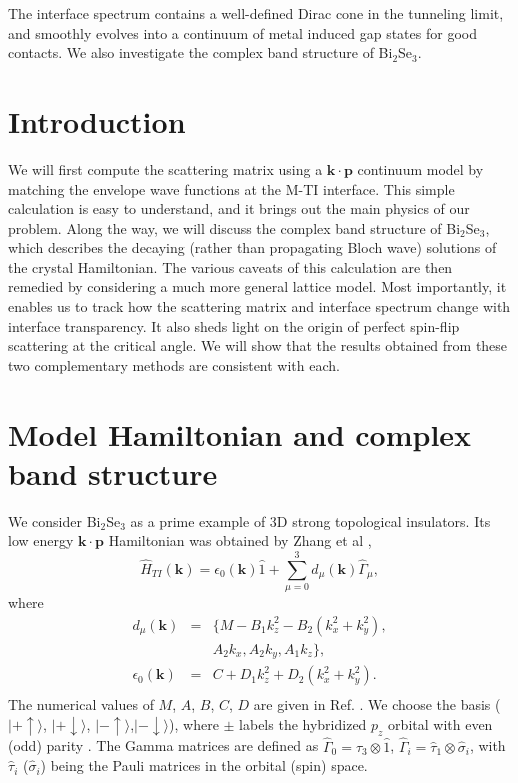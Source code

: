 \documentclass[12pt,twocolumn]{article}
\def\v#1{\mathbf{#1}}
\def\ket#1{\vert #1 \rangle}
\begin{document}
The interface spectrum contains a well-defined Dirac cone in the tunneling limit, and smoothly evolves into a continuum of metal induced gap states for good contacts. We also investigate the complex band structure of Bi$_2$Se$_3$.

\section{Introduction}


We will first compute the scattering matrix using a $\mathbf{k\cdot p}$ continuum model 
by matching the envelope wave functions at the M-TI interface. This simple calculation is easy to understand, 
and it brings out
the main physics of our problem. Along the way, we will discuss the complex band structure of Bi$_2$Se$_3$,
 which describes the decaying (rather than propagating Bloch wave) solutions of the crystal Hamiltonian.
The various caveats of this calculation 
are then remedied by considering a much more general lattice model. Most importantly, it enables us to 
track how the scattering matrix and interface spectrum change with interface transparency. It also sheds light on
the origin of perfect spin-flip scattering at the critical angle.
We will show that the results obtained from these two complementary methods are consistent with each.

\section{Model Hamiltonian and complex band structure}

We consider Bi$_2$Se$_3$ as a prime example of 3D strong topological insulators. Its low energy $\mathbf{k\cdot p}$ Hamiltonian was obtained by Zhang et al \cite{zhang2009},
\[
\hat{H}_{TI}(\v{k})=\epsilon_0(\v{k})\hat{1}+\sum_{\mu=0}^{3}d_\mu(\v{k})\hat{\Gamma}_\mu,
\]
where 
\begin{eqnarray*}
d_\mu(\v{k})&=&\{M-B_1k^2_z-B_2(k_x^2+k_y^2),\\
&  &A_2 k_x, A_2 k_y, A_1 k_z\},\\ \epsilon_0(\v{k})&=&C+D_1k_z^2+D_2(k_x^2+k_y^2).\\ 
\end{eqnarray*}
The numerical values of $M$, $A$, $B$, $C$, $D$ are given in Ref. 
\cite{zhang2009}.
We choose the basis ($\ket{+\uparrow}$, $\ket{+\downarrow}$, $\ket{-\uparrow}$,$\ket{-\downarrow}$), where $\pm$ labels the hybridized $p_z$ orbital with even (odd) parity \cite{zhang2009}. The Gamma matrices are defined as
$\hat{\Gamma}_0=\hat{\tau}_3\otimes \hat{1}$, $\hat{\Gamma}_i=\hat{\tau}_1\otimes \hat{\sigma}_i$, with
$\hat{\tau}_i$ ($\hat{\sigma}_i$) being the Pauli matrices in the orbital (spin) space.
\end{document}
